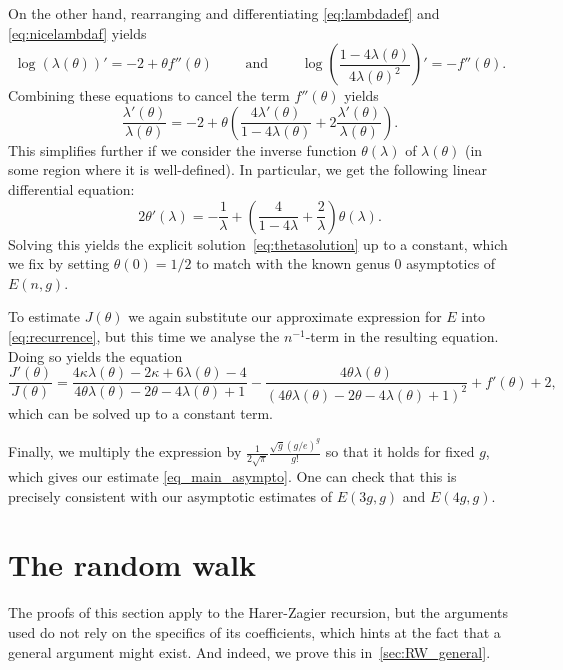 \documentclass[a4paper,12pt]{article}
\theoremstyle{definition}
\newcommand{\E}{E}
\begin{document}
On the other hand, rearranging and differentiating \eqref{eq:lambdadef} and \eqref{eq:nicelambdaf} yields
\[
    \log(\lambda(\theta))'=-2+\theta f''(\theta) 
    \qquad \text{ and } \qquad 
    \log\left(\frac{1-4\lambda(\theta)}{4\lambda(\theta)^{2}}\right)'=-f''(\theta).
\]
Combining these equations to cancel the term $f''(\theta)$ yields 
\[\frac{\lambda'(\theta)}{\lambda(\theta)}=-2+\theta\left(\frac{4\lambda'(\theta)}{1-4\lambda(\theta)}+2\frac{\lambda'(\theta)}{\lambda(\theta)}\right).\]
This simplifies further if we consider the inverse function $\theta(\lambda)$ of $\lambda(\theta)$ (in some region where it is well-defined). In particular, we get the following linear differential equation:
\[2\theta'(\lambda)=-\frac{1}{\lambda}+\left(\frac{4}{1-4\lambda}+\frac{2}{\lambda}\right)\theta(\lambda).\]
Solving this yields the explicit solution~\eqref{eq:thetasolution} up to a constant, which we fix by setting $\theta(0)=1/2$ to match with the known genus $0$ asymptotics of $E(n,g)$.

To estimate $J(\theta)$ we again substitute our approximate expression for $\E$ into \eqref{eq:recurrence}, but this time we analyse the $n^{-1}$-term in the resulting equation. Doing so yields the equation
\[\frac{J'(\theta)}{J(\theta)}=\frac{4\kappa\lambda(\theta)-2\kappa+6\lambda(\theta)-4}{4\theta\lambda(\theta)-2\theta-4\lambda(\theta)+1}-\frac{4\theta\lambda(\theta)}{(4\theta\lambda(\theta)-2\theta-4\lambda(\theta)+1)^2}+f'(\theta)+2,\]
which can be solved up to a constant term. 


Finally, we multiply the expression by $\frac{1}{2\sqrt{\pi}} \frac{\sqrt{g}(g/e)^g}{g!}$ so that it holds for fixed $g$, which gives our estimate \eqref{eq_main_asympto}. One can check that this is precisely consistent with our asymptotic estimates of $\E(3g,g)$ and $\E(4g,g)$. 


\section{The random walk}\label{sec:RW}

The proofs of this section apply to the Harer-Zagier recursion, but the arguments used do not rely on the specifics of its coefficients, which hints at the fact that a general argument might exist. And indeed, we prove this in~\cref{sec:RW_general}.
\end{document}
